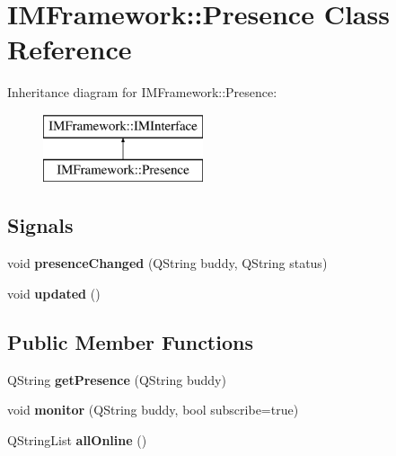 \hypertarget{classIMFramework_1_1Presence}{
\section{IMFramework::Presence Class Reference}
\label{classIMFramework_1_1Presence}
}
Inheritance diagram for IMFramework::Presence:\begin{figure}[H]
\begin{center}
\leavevmode
\includegraphics[height=2cm]{classIMFramework_1_1Presence}
\end{center}
\end{figure}
\subsection*{Signals}
\begin{DoxyCompactItemize}
\item 
\hypertarget{classIMFramework_1_1Presence_a01d5e8d5a517819fbdb358815109deb8}{
void {\bfseries presenceChanged} (QString buddy, QString status)}
\label{classIMFramework_1_1Presence_a01d5e8d5a517819fbdb358815109deb8}

\item 
\hypertarget{classIMFramework_1_1Presence_a59e2222d3f2c1d3e5356e6c7b448ece3}{
void {\bfseries updated} ()}
\label{classIMFramework_1_1Presence_a59e2222d3f2c1d3e5356e6c7b448ece3}

\end{DoxyCompactItemize}
\subsection*{Public Member Functions}
\begin{DoxyCompactItemize}
\item 
\hypertarget{classIMFramework_1_1Presence_ab5babc9cd970b23b5dfcc716e221d923}{
QString {\bfseries getPresence} (QString buddy)}
\label{classIMFramework_1_1Presence_ab5babc9cd970b23b5dfcc716e221d923}

\item 
\hypertarget{classIMFramework_1_1Presence_adf265d6547d736cb764d9597b707daf9}{
void {\bfseries monitor} (QString buddy, bool subscribe=true)}
\label{classIMFramework_1_1Presence_adf265d6547d736cb764d9597b707daf9}

\item 
\hypertarget{classIMFramework_1_1Presence_a06e4622508dccda11049c6e9f214b037}{
QStringList {\bfseries allOnline} ()}
\label{classIMFramework_1_1Presence_a06e4622508dccda11049c6e9f214b037}

\end{DoxyCompactItemize}
